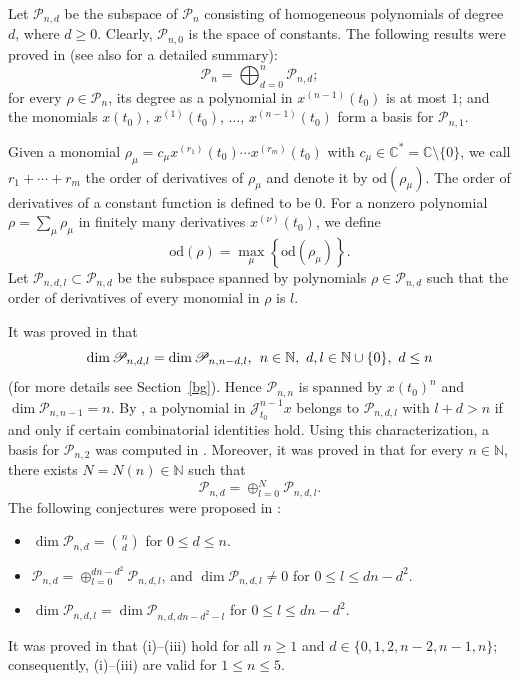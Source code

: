 \documentclass[11pt]{amsart}
\numberwithin{equation}{section}
\newcommand{\di}{\displaystyle}
\newcommand{\bc}{\mathbb{C}}
\newcommand{\bn}{\mathbb{N}}
\newcommand{\sd}{\mathrm{od}}
\newcommand{\scp}{\mathscr{P}}
\newcommand{\sjmx}{\mathscr{J}^{n-1}_{t_0} x}
\newcommand{\pn}{\mathscr{P}_{n}}
\newcommand{\pnd}{\mathscr{P}_{n, d}}
\newcommand{\pny}{\mathscr{P}_{n, 1}}
\newcommand{\pnn}{\mathscr{P}_{n, n}}
\newcommand{\pndl}{\mathscr{P}_{n, d, l}}
\begin{document}
Let $\scp_{n,d}$ be the subspace of $\pn$ consisting of homogeneous polynomials of degree $d$, where $d\ge 0$. Clearly, $\di\scp_{n,0}$ is the space of constants. The following results were proved in \cite[Sections 3, 4]{z03} (see also \cite[Section 2]{wz} for a detailed summary): $$\pn=\bigoplus_{d=0}^{n}\pnd;$$
for every $\rho\in\pn$, its degree as a polynomial in $\di x^{(n-1)}(t_0)$ is at most $1$; and the monomials $\di x(t_0)$, $\di x^{(1)}(t_0)$, $\dots$, $\di x^{(n-1)}(t_0)$ form a basis for $\pny$.

Given a monomial $\di\rho_{\mu}=c_{\mu}x^{(r_1)}(t_0)\cdots x^{(r_m)}(t_0)$ with $c_{\mu} \in \bc^{\ast}=\bc\setminus\{0\}$, we call $r_1+\cdots+r_m$ the order of derivatives of $\rho_{\mu}$ and denote it by $\sd(\rho_{\mu})$.
The order of derivatives of a constant function is defined to be $0$. For a nonzero polynomial $\rho=\sum_{\mu}\rho_{\mu}$ in finitely many derivatives $\di x^{(\nu)}(t_0)$, we define
\[
    \sd(\rho)=\max_{\mu}\left\{\sd(\rho_{\mu})\right\}.
\]
Let $\pndl\subset\pnd$ be the subspace spanned by polynomials $\rho\in\pnd$ such that the order of derivatives of every monomial in $\rho$ is $l$.

It was proved in \cite{wz} that
\begin{equation}\label{sym}
    \dim\pndl=\dim\scp_{n,n-d,l},\hspace{1.5mm} n\in\bn,\ d,l\in\bn\cup\{0\},\ d\le n
\end{equation}
(for more details see Section~\ref{bg}). Hence $\pnn$ is spanned by $x(t_0)^n$ and $\dim\scp_{n,n-1}=n$.
By \cite[Proposition 3.1]{wz}, a polynomial in $\sjmx$ belongs to $\pndl$ with $l+d>n$ if and only if certain combinatorial identities hold.
Using this characterization, a basis for $\scp_{n,2}$ was computed in \cite[Theorem 1.1]{wz}.
Moreover, it was proved in \cite[Proposition 3.2]{wz} that for every $n\in\bn$, there exists $N=N(n)\in\bn$ such that
\begin{equation} \label{pndl}
   \pnd=\oplus_{l=0}^{N} \scp_{n, d, l}.
\end{equation}
The following conjectures were proposed in \cite[Section 1]{wz}:
\begin{itemize}
  \item[(i)] $\di \dim \pnd=\binom{n}{d}$ for $0 \le d \le n$.

  \item[(ii)] $\di \pnd=\oplus_{l=0}^{dn-d^2} \scp_{n, d, l}$, and $\dim \scp_{n, d, l} \neq 0$ for $0 \le l \le dn-d^2$.

  \item[(iii)] $\di \dim \scp_{n, d, l}=\dim \scp_{n, d, dn-d^2-l}$ for $0 \le l \le dn-d^2$.
\end{itemize}
It was proved in \cite{z03,wz} that (i)--(iii) hold for all $n\ge1$ and $d\in\{0,1,2,n-2,n-1,n\}$; consequently, (i)--(iii) are valid for $1\le n\le5$.
\end{document}
